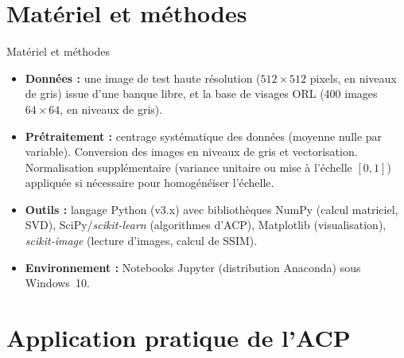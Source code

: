 \documentclass{beamer}
\begin{document}
\section{Matériel et méthodes}

\begin{frame}{Matériel et méthodes}
\begin{itemize}
  \item \textbf{Données :} une image de test haute résolution ($512\times512$ pixels, en niveaux de gris) issue d’une banque libre, et la base de visages ORL (400 images $64\times64$, en niveaux de gris).
  \item \textbf{Prétraitement :} centrage systématique des données (moyenne nulle par variable). Conversion des images en niveaux de gris et vectorisation. Normalisation supplémentaire (variance unitaire ou mise à l’échelle $[0,1]$) appliquée si nécessaire pour homogénéiser l’échelle.
  \item \textbf{Outils :} langage Python (v3.x) avec bibliothèques NumPy (calcul matriciel, SVD), SciPy/\textit{scikit-learn} (algorithmes d’ACP), Matplotlib (visualisation), \textit{scikit-image} (lecture d’images, calcul de SSIM).
  \item \textbf{Environnement :} Notebooks Jupyter (distribution Anaconda) sous Windows 10.
\end{itemize}
\end{frame}

\section{Application pratique de l'ACP}
\end{document}
